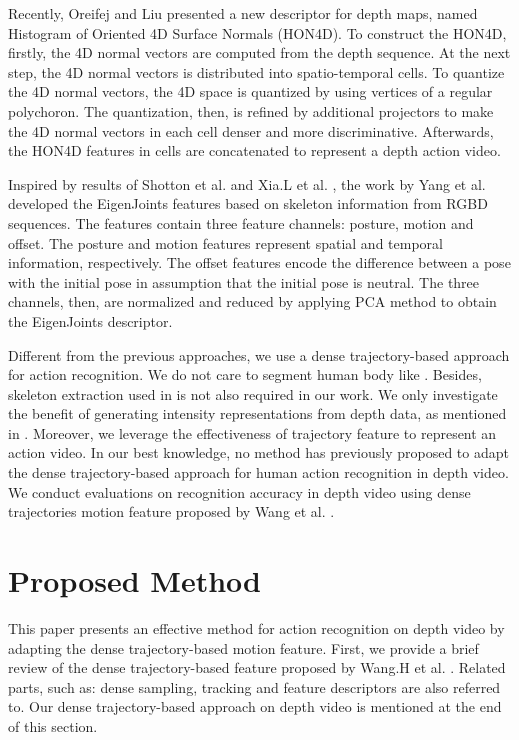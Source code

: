 \documentclass[review]{elsarticle}
\begin{document}
Recently, Oreifej and Liu \cite{oreifej2013hon4d} presented a new descriptor for depth maps, named Histogram of Oriented 4D Surface Normals (HON4D). To construct the HON4D, firstly, the 4D normal vectors are computed from the depth sequence. At the next step, the 4D normal vectors is distributed into spatio-temporal cells. To quantize the 4D normal vectors, the 4D space is quantized by using vertices of a regular polychoron. The quantization, then, is refined by additional projectors to make the 4D normal vectors in each cell denser and more discriminative. Afterwards, the HON4D features in cells are concatenated to represent a depth action video.

Inspired by results of Shotton et al. \cite{shotton2013real} and Xia.L et al. \cite{xia2011human}, the work by Yang et al. \cite{yang2012eigenjoints} developed the EigenJoints features based on skeleton information from RGBD sequences. The features contain three feature channels: posture, motion and offset. The posture and motion features represent spatial and temporal information, respectively. The offset features encode the difference between a pose with the initial pose in assumption that the initial pose is neutral. The three channels, then, are normalized and reduced by applying PCA method to obtain the EigenJoints descriptor.

Different from the previous approaches, we use a dense trajectory-based approach for action recognition. We do not care to segment human body like \cite{li2010action,yang2012recognizing}. Besides, skeleton extraction used in \cite{yang2012eigenjoints, wang2012mining} is not also required in our work. We only investigate the benefit of generating intensity representations from depth data, as mentioned in \cite{li2010action,yang2012recognizing}. Moreover, we leverage the effectiveness of trajectory feature to represent an action video. In our best knowledge, no method has previously proposed to adapt the dense trajectory-based approach for human action recognition in depth video. We conduct evaluations on recognition accuracy in depth video using dense trajectories motion feature proposed by Wang et al. \cite{wang2011densetraj}.

\section{Proposed Method}
\label{lbl:ProposedMethod}

This paper presents an effective method for action recognition on depth video by adapting the dense trajectory-based motion feature. First, we provide a brief review of the dense trajectory-based feature proposed by Wang.H et al. \cite{wang2011densetraj}. Related parts, such as: dense sampling, tracking and feature descriptors are also referred to. Our dense trajectory-based approach on depth video is mentioned at the end of this section.
\end{document}
